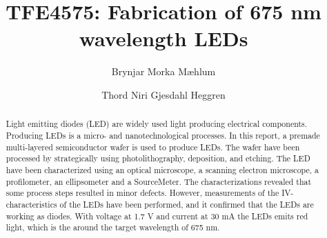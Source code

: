 \documentclass[5p,sort&compress]{elsarticle}
\begin{document}
\begin{frontmatter}

  \title{TFE4575: Fabrication of 675 nm wavelength LEDs}

  \author[fysikk]{Brynjar Morka Mæhlum}
  \author[fysikk]{Thord Niri Gjesdahl Heggren}
  \address[fysikk]{Department of Physics, Norwegian University of Science and Technology, 7491 Trondheim, Norway.}

  \begin{abstract}

    \noindent Light emitting diodes (LED) are widely used light producing electrical components.
    Producing LEDs is a micro- and nanotechnological processes.
    In this report, a premade multi-layered semiconductor wafer is used to produce LEDs.
    The wafer have been processed by strategically using photolithography, deposition, and etching.
    The LED have been characterized using an optical microscope, a scanning electron microscope, a profilometer, an ellipsometer and a SourceMeter.
    The characterizations revealed that some process steps resulted in minor defects. 
    However, measurements of the IV-characteristics of the LEDs have been performed, and it confirmed that the LEDs are working as diodes.
    With voltage at 1.7 V and current at 30 mA the LEDs emits red light, which is the around the target wavelength of 675 nm.

  \end{abstract}
 

\end{frontmatter}
\end{document}
